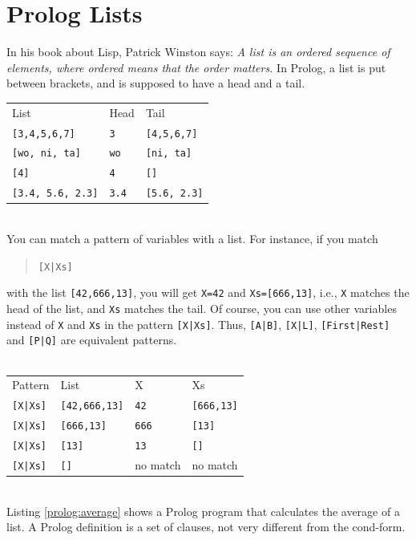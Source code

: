 \documentclass[a4paper,12pt]{book}
\begin{document}
\section{Prolog Lists}
In his book about Lisp, Patrick Winston says: {\em A list is an
ordered sequence of elements, where ordered means that the
order matters.} In Prolog, a list is put between brackets,
and is supposed to have a head and a tail.\\

\begin{tabular}{p{5cm}p{3cm}p{3cm}}
List &  Head & Tail\\
\verb|[3,4,5,6,7]| & \verb|3| & \verb|[4,5,6,7]|\\ 
\verb|[wo, ni, ta]| & \verb|wo| & \verb|[ni, ta]|\\
\verb|[4]| & \verb|4| & \verb|[]|\\
\verb|[3.4, 5.6, 2.3]| & \verb|3.4| &  \verb|[5.6, 2.3]|\\ 
\end{tabular}

\verb||\\
You can match a pattern of variables with a list. For instance,
if you match
\begin{quote}
\verb/[X|Xs]/
\end{quote}
with the list \verb|[42,666,13]|, you will get \verb|X=42| and
\verb|Xs=[666,13]|, i.e., \verb|X| matches the head of the list,
and \verb|Xs| matches the tail. Of course, you can use other
variables instead of \verb|X| and \verb|Xs| in the pattern
\verb/[X|Xs]/. Thus, \verb/[A|B]/, \verb/[X|L]/, \verb/[First|Rest]/
and \verb/[P|Q]/ are equivalent patterns.\\
\verb||\\
\begin{tabular}{p{3cm}p{3cm}p{3cm}p{3cm}}
Pattern & List &  X & Xs\\
\verb/[X|Xs]/ & \verb|[42,666,13]| & \verb|42| & \verb|[666,13]|\\ 
\verb/[X|Xs]/ & \verb|[666,13]| & \verb|666| & \verb|[13]|\\
\verb/[X|Xs]/ &  \verb|[13]| & \verb|13| & \verb|[]|\\
\verb/[X|Xs]/ &  \verb|[]| & no match &  no match\\ 
\end{tabular}

\verb||\\
Listing \ref{prolog:average} shows a Prolog program that calculates
the average of a list. A Prolog definition is a set of clauses, not
very different from the cond-form.
\end{document}
